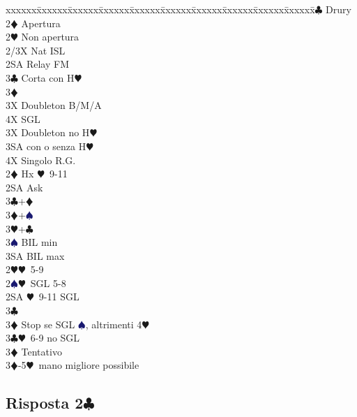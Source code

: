 \documentclass[a4paper,italian]{article}
\newcommand{\BC}{\textcolor{OliveGreen}{$\clubsuit$}}
\newcommand{\BD}{\textcolor{RedOrange}{$\vardiamondsuit$}}
\newcommand{\BH}{\textcolor{Red2}{$\varheartsuit${}}}
\newcommand{\BS}{\textcolor{MidnightBlue}{$\spadesuit${}}}
\newcommand{\pdfc}{\texorpdfstring{\BC{}}{C}}
\newenvironment{bidtable}
{\begin{tabbing}

    xxxxxx\=xxxxxx\=xxxxxx\=xxxxxx\=xxxxxx\=xxxxxx\=xxxxxx\=xxxxxx\=xxxxxx\=xxxxxx\=\kill}
{\end{tabbing} }%
\begin{document}
\begin{multicols}{2}
    \begin{bidtable}
        2\BC \> Drury\+\\
        2\BD \> Apertura\\
        2\BH \> Non apertura\\
        2/3X \> Nat ISL\\
        2SA \> Relay FM\+\\
        3\BC \> Corta con H\BH \+\\
        3\BD \> \textregistered\+\\
        3X \> Doubleton B/M/A\\
        4X \> SGL\-\-\\
        3X \> Doubleton no H\BH \\
        3SA  con o senza H\BH \\
        4X \> Singolo R.G.\-\-\\
        2\BD \> Hx \BH\ 9-11\+\\
        2SA \> Ask \+\\
        3\BC {}+\BD\\
        3\BD {}+\BS\\
        3\BH {}+\BC\\
        3\BS \> BIL min\\
        3SA \> BIL max\-\-\\
        2\BH {}\BH\ 5-9\\
        2\BS {}\BH\ SGL 5-8\\
        2SA \BH\ 9-11 SGL\+\\
        3\BC \> \textregistered\\
        3\BD \> Stop se SGL \BS, altrimenti 4\BH\-\\
        3\BC {}\BH\ 6-9 no SGL\+\\
        3\BD \> Tentativo \-\\
        3\BD {}-5\BH\ mano migliore possibile\\
    \end{bidtable}
    \bigbreak

\end{multicols}

\pagebreak

\subsection{Risposta 2\pdfc}
\end{document}
